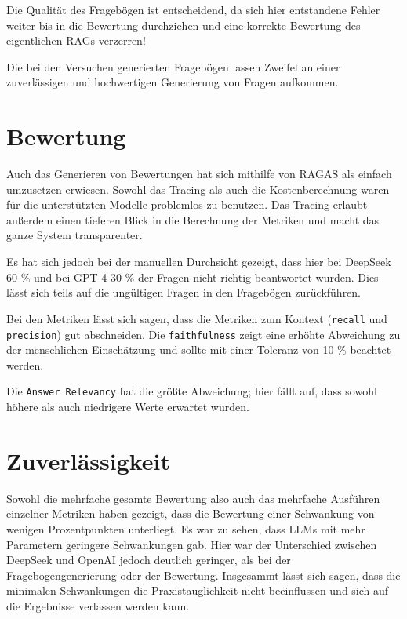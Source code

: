 Die Qualität des Fragebögen ist entscheidend, da sich hier entstandene Fehler weiter bis in die Bewertung durchziehen und eine korrekte Bewertung des eigentlichen RAGs verzerren!

Die bei den Versuchen generierten Fragebögen lassen Zweifel an einer zuverlässigen und hochwertigen Generierung von Fragen aufkommen.

\section{Bewertung}

Auch das Generieren von Bewertungen hat sich mithilfe von RAGAS als einfach umzusetzen erwiesen.
Sowohl das Tracing als auch die Kostenberechnung waren für die unterstützten Modelle problemlos zu benutzen.
Das Tracing erlaubt außerdem einen tieferen Blick in die Berechnung der Metriken und macht das ganze System transparenter.

Es hat sich jedoch bei der manuellen Durchsicht gezeigt, dass hier bei DeepSeek 60 \% und bei GPT-4 30 \% der Fragen nicht richtig beantwortet wurden.
Dies lässt sich teils auf die ungültigen Fragen in den Fragebögen zurückführen.

Bei den Metriken lässt sich sagen, dass die Metriken zum Kontext (\texttt{recall} und \texttt{precision}) gut abschneiden.
Die \texttt{faithfulness} zeigt eine erhöhte Abweichung zu der menschlichen Einschätzung und sollte mit einer Toleranz von 10 \% beachtet werden.

Die \texttt{Answer Relevancy} hat die größte Abweichung; hier fällt auf, dass sowohl höhere als auch niedrigere Werte erwartet wurden.

\section{Zuverlässigkeit}

Sowohl die mehrfache gesamte Bewertung also auch das mehrfache Ausführen einzelner Metriken haben gezeigt, dass die Bewertung einer Schwankung von wenigen Prozentpunkten unterliegt.
Es war zu sehen, dass LLMs mit mehr Parametern geringere Schwankungen gab.
Hier war der Unterschied zwischen DeepSeek und OpenAI jedoch deutlich geringer, als bei der Fragebogengenerierung oder der Bewertung.
Insgesammt lässt sich sagen, dass die minimalen Schwankungen die Praxistauglichkeit nicht beeinflussen und sich auf die Ergebnisse verlassen werden kann.

